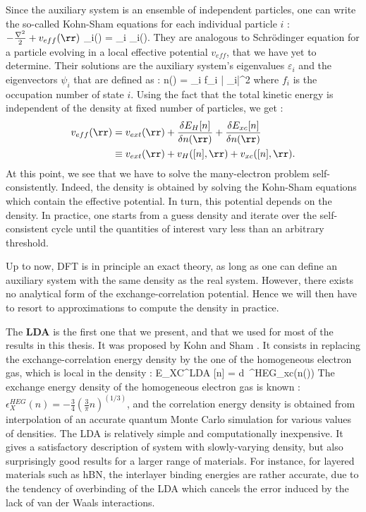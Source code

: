 Since the auxiliary system is an ensemble of independent particles, one can write the so-called Kohn-Sham equations for each individual particle $i$ :
\be
 	\( -\frac{\nabla^2}{2} + v_{eff}(\rr)\) \psi_i(\rr) = \varepsilon_i \psi_i(\rr).
\ee
They are analogous to Schrödinger equation for a particle evolving in a local effective potential $v_{eff}$, that we have yet to determine. Their solutions are the auxiliary system's eigenvalues $\varepsilon_i$ and the eigenvectors $\psi_i$ that are defined as :
\be
 	n(\rr) = \sum_i f_i \left| \psi_i\right|^2
\ee
where $f_i$ is the occupation number of state $i$. Using the fact that the total kinetic energy is independent of the density at fixed number of particles, we get :
\begin{align}
\begin{split}
	v_{eff}(\rr) &= v_{ext}(\rr) + \frac{\delta E_H[n]}{\delta n(\rr)} + \frac{\delta E_{xc}[n]}{\delta n(\rr)} \\
	&\equiv v_{ext}(\rr) + v_H([n],\rr) + v_{xc}([n],\rr).
\end{split}
\end{align}
At this point, we see that we have to solve the many-electron problem self-consistently. Indeed, the density is obtained by solving the Kohn-Sham equations which contain the effective potential. In turn, this potential depends on the density. In practice, one starts from a guess density and iterate over the self-consistent cycle until the quantities of interest vary less than an arbitrary threshold.

Up to now, \gls{DFT} is in principle an exact theory, as long as one can define an auxiliary system with the same density as the real system. However, there exists no analytical form of the exchange-correlation potential. Hence we will then have to resort to approximations to compute the density in practice.

The \textbf{\gls{LDA}} is the first one that we present, and that we used for most of the results in this thesis. It was proposed by Kohn and Sham \cite{kohn1965}. It consists in replacing the exchange-correlation energy density by the one of the homogeneous electron gas, which is local in the density :
\be
	E_{XC}^{LDA} [n] = \int d\rr \ \epsilon^{HEG}_{xc}(n(\rr))
\ee
The exchange energy density of the homogeneous electron gas is known : $\epsilon_X^{HEG}(n) = -\tfrac{3}{4}(\tfrac{3}{\pi}n)^{(1/3)}$, and the correlation energy density is obtained from interpolation of an accurate quantum Monte Carlo simulation \cite{ceperley1980ground} for various values of densities. The LDA is relatively simple and computationally inexpensive. It gives a satisfactory description of system with slowly-varying density, but also surprisingly good results for a larger range of materials. For instance, for layered materials such as hBN, the interlayer binding energies are rather accurate, due to the tendency of overbinding of the LDA which cancels the error induced by the lack of van der Waals interactions.

